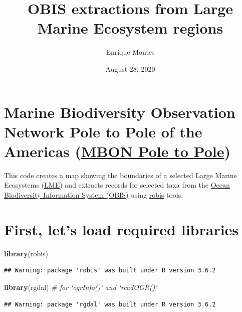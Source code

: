 \documentclass[12pt,]{article}
\title{OBIS extractions from Large Marine Ecosystem regions}
\author{Enrique Montes}
\date{August 28, 2020}
\newenvironment{Shaded}{\begin{snugshade}}{\end{snugshade}}
\newcommand{\CommentTok}[1]{\textcolor[rgb]{0.56,0.35,0.01}{\textit{#1}}}
\newcommand{\KeywordTok}[1]{\textcolor[rgb]{0.13,0.29,0.53}{\textbf{#1}}}
\newcommand{\NormalTok}[1]{#1}
\begin{document}
\maketitle

\hypertarget{marine-biodiversity-observation-network-pole-to-pole-of-the-americas-mbon-pole-to-pole}{%
\section{\texorpdfstring{Marine Biodiversity Observation Network Pole to
Pole of the Americas (\href{https://marinebon.org/p2p/}{MBON Pole to
Pole})}{Marine Biodiversity Observation Network Pole to Pole of the Americas (MBON Pole to Pole)}}\label{marine-biodiversity-observation-network-pole-to-pole-of-the-americas-mbon-pole-to-pole}}

This code creates a map showing the boundaries of a selected Large
Marine Ecosystems
(\href{http://lme.edc.uri.edu/index.php/lme-introduction}{LME}) and
extracts records for selected taxa from the
\href{https://obis.org/}{Ocean Biodiversity Information System (OBIS)}
using \href{https://obis.org/manual/accessr/}{robis} tools.

\hypertarget{first-lets-load-required-libraries}{%
\section{First, let's load required
libraries}\label{first-lets-load-required-libraries}}

\begin{Shaded}
\begin{Highlighting}[]
\KeywordTok{library}\NormalTok{(robis)}
\end{Highlighting}
\end{Shaded}

\begin{verbatim}
## Warning: package 'robis' was built under R version 3.6.2
\end{verbatim}

\begin{Shaded}
\begin{Highlighting}[]
\KeywordTok{library}\NormalTok{(rgdal) }\CommentTok{# for `ogrInfo()` and `readOGR()`}
\end{Highlighting}
\end{Shaded}

\begin{verbatim}
## Warning: package 'rgdal' was built under R version 3.6.2
\end{verbatim}
\end{document}

